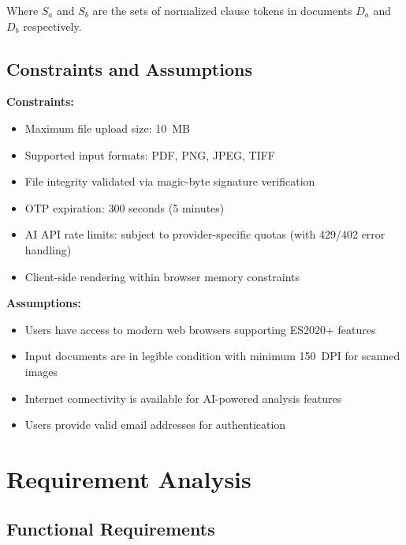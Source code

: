 \documentclass[12pt,a4paper,oneside]{report}
\begin{document}
Where $S_a$ and $S_b$ are the sets of normalized clause tokens in documents $D_a$ and $D_b$ respectively.

\section{Constraints and Assumptions}

\textbf{Constraints:}
\begin{itemize}[leftmargin=2cm]
  \item Maximum file upload size: 10~MB
  \item Supported input formats: PDF, PNG, JPEG, TIFF
  \item File integrity validated via magic-byte signature verification
  \item OTP expiration: 300 seconds (5 minutes)
  \item AI API rate limits: subject to provider-specific quotas (with 429/402 error handling)
  \item Client-side rendering within browser memory constraints
\end{itemize}

\textbf{Assumptions:}
\begin{itemize}[leftmargin=2cm]
  \item Users have access to modern web browsers supporting ES2020+ features
  \item Input documents are in legible condition with minimum 150~DPI for scanned images
  \item Internet connectivity is available for AI-powered analysis features
  \item Users provide valid email addresses for authentication
\end{itemize}

\chapter{Requirement Analysis}

\section{Functional Requirements}
\end{document}
